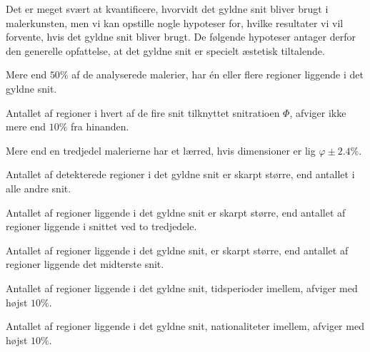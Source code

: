{
{\sffamily Det er meget svært at kvantificere, hvorvidt det gyldne snit
bliver brugt i malerkunsten, men vi kan opstille nogle hypoteser for,
hvilke resultater vi vil forvente, hvis det gyldne snit bliver brugt.
De følgende hypoteser antager derfor den generelle opfattelse, at det
gyldne snit er specielt æstetisk tiltalende.
}

\begin{hypotese}
    Mere end $50\%$ af de analyserede malerier, har én eller flere
    regioner liggende i det gyldne snit.
    \label{hypo_binaer}
\end{hypotese}

\begin{hypotese}
    Antallet af regioner i hvert af de fire snit tilknyttet snitratioen
    $\varPhi$, afviger ikke mere end $10\%$ fra hinanden.
    \label{hypo_fire_g_snit}
\end{hypotese}

\begin{hypotese}
    Mere end en tredjedel malerierne har et lærred, hvis
    dimensioner er lig $\varphi\pm2.4\%$.
    \label{hypo_golden_ractangle}
\end{hypotese}

\begin{hypotese}
    Antallet af detekterede regioner i det gyldne snit er skarpt
    større, end antallet i alle andre snit.
    \label{hypo_alle_andre_snit}
\end{hypotese}

\begin{hypotese}
    Antallet af regioner liggende i det gyldne snit er skarpt større, end
    antallet af regioner liggende i snittet ved to tredjedele.
    \label{hypo_to_tredjedele}
\end{hypotese}

\begin{hypotese}
    Antallet af regioner liggende i det gyldne snit, er skarpt større, end
    antallet af regioner liggende det midterste snit.
    \label{hypo_midten}
\end{hypotese}

\begin{hypotese}
    Antallet af regioner liggende i det gyldne snit, tidsperioder
    imellem, afviger med højst $10\%$.
    \label{hypo_tid}
\end{hypotese}

\begin{hypotese}
    Antallet af regioner liggende i det gyldne snit, nationaliteter
    imellem, afviger med højst $10\%$.
	\label{hypo_nation}
\end{hypotese}

}
